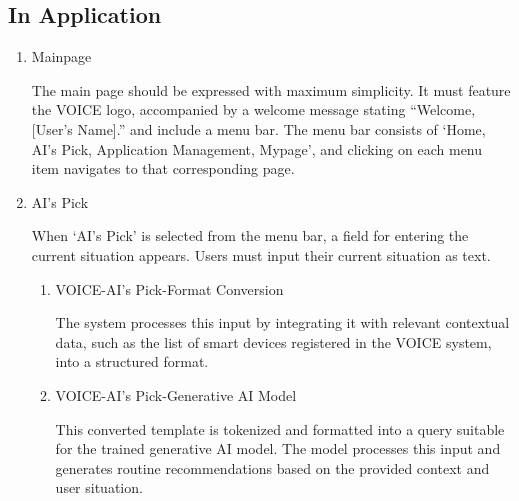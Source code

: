 \documentclass[conference]{IEEEtran}
\begin{document}
\vspace{0.7em} %

\subsection{In Application}
\vspace{0.5em}

\begin{enumerate}[label=\arabic*]
    \item Mainpage\par
    \vspace{0.3em}
    The main page should be expressed with maximum simplicity. It must feature the VOICE logo, accompanied by a welcome message stating “Welcome, [User's Name].” and include a menu bar. The menu bar consists of ‘Home, AI's Pick, Application Management, Mypage’, and clicking on each menu item navigates to that corresponding page.

    \vspace{1em}

    \item AI's Pick\par
    \vspace{0.3em}
    When ‘AI's Pick’ is selected from the menu bar, a field for entering the current situation appears. Users must input their current situation as text.
    \vspace{0.3em}

    \begin{enumerate}[label=\arabic*)]
        \item VOICE-AI's Pick-Format Conversion\par
        \vspace{0.3em}
        The system processes this input by integrating it with relevant contextual data, such as the list of smart devices registered in the VOICE system, into a structured format.

        \vspace{1em}

        \item VOICE-AI's Pick-Generative AI Model\par
        \vspace{0.3em}
        This converted template is tokenized and formatted into a query suitable for the trained generative AI model. The model processes this input and generates routine recommendations based on the provided context and user situation.


\end{enumerate}
\end{enumerate}
\end{document}
